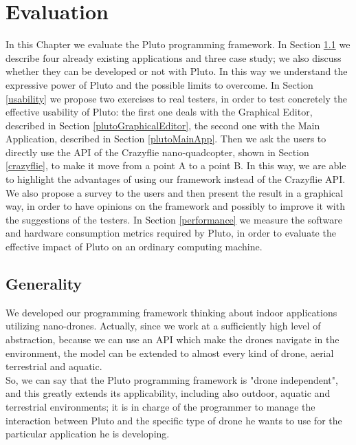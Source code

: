\chapter{Evaluation}
\label{cap6}

In this Chapter we evaluate the Pluto programming framework.
In Section \ref{applicability} we describe four already existing applications and three case study;
we also discuss whether they can be developed or not with Pluto. 
In this way we understand the expressive power of Pluto and the possible limits to overcome.
In Section \ref{usability} we propose two exercises to real testers, in order to test concretely the effective usability of Pluto:
the first one deals with the Graphical Editor, described in Section \ref{plutoGraphicalEditor}, the second one with the Main Application, described in Section \ref{plutoMainApp}.
Then we ask the users to directly use the API of the Crazyflie nano-quadcopter, shown in Section \ref{crazyflie}, to make it move from a point A to a point B.
In this way, we are able to highlight the advantages of using our framework instead of the Crazyflie API.
We also propose a survey to the users and then present the result in a graphical way, in order to have opinions on the framework and possibly to improve it with the suggestions of the testers.
In Section \ref{performance} we measure the software and hardware consumption metrics required by Pluto, in order to evaluate the effective impact of Pluto on an ordinary computing machine.


\section{Generality}\label{applicability}

We developed our programming framework thinking about indoor applications utilizing nano-drones.
Actually, since we work at a sufficiently high level of abstraction, because we can use an API which make the drones navigate in the environment, the model can be extended to almost every kind of drone, aerial terrestrial and aquatic.
\\
So, we can say that the Pluto programming framework is "drone independent", and this greatly extends its applicability, including also outdoor, aquatic and terrestrial environments; it is in charge of the programmer to manage the interaction between Pluto and the specific type of drone he wants to use for the particular application he is developing.
\\

